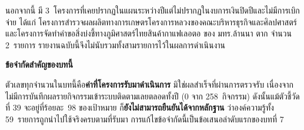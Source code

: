 นอกจากนี้ มี 3~โครงการที่เคยปรากฏในแผนระหว่างปีแต่ไม่ปรากฏในงบการเงินปิดปีและไม่มีการเบิกจ่าย
ได้แก่ โครงการสำรวจผลผลิตทางการเกษตรโครงการหลวงของคณะบริหารธุรกิจและศิลปศาสตร์
และโครงการจัดทำคำขอสิ่งบ่งชี้ทางภูมิศาสตร์ไทยสินค้ากาแฟเลอตอ ของ มทร.ล้านนา ตาก จำนวน 2~รายการ
รายงานฉบับนี้จึงไม่นับรวมทั้งสามรายการไว้ในผลการดำเนินงาน

\begin{warnbox}
\textbf{ข้อจำกัดสำคัญของบทนี้}\par
ตัวเลขทุกจำนวนในบทนี้คือ\textbf{ค่าที่โครงการรับมาดำเนินการ} มิใช่ผลสำเร็จที่ผ่านการตรวจรับ
เนื่องจากไม่มีการบันทึกผลรายกิจกรรมเข้าระบบติดตามเลยตลอดทั้งปี (0 จาก 258~กิจกรรม)
ดังนั้นแม้ตัวชี้วัดที่ 39 จะอยู่ที่ร้อยละ~98 ของเป้าหมาย ก็\textbf{ยังไม่สามารถยืนยันได้จากหลักฐาน}
ว่าองค์ความรู้ทั้ง 59~รายการถูกนำไปใช้จริงครบตามที่รับมา
การแก้ไขข้อจำกัดนี้เป็นข้อเสนอลำดับแรกของบทที่ 7
\end{warnbox}
